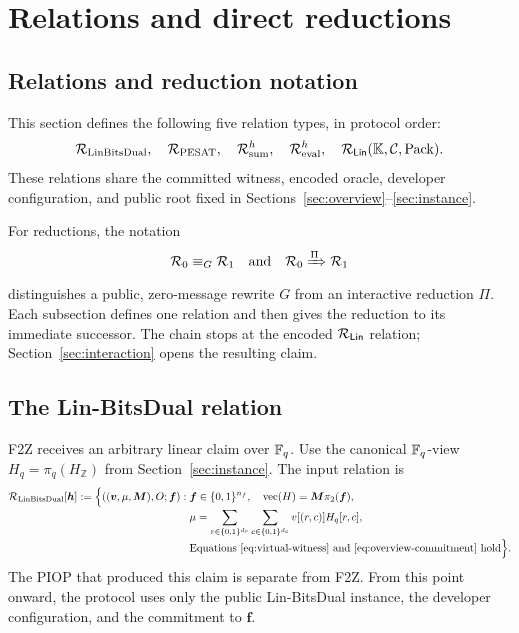 \section{Relations and direct reductions}
\label{sec:encoding}

\begingroup\footnotesize

\subsection{Relations and reduction notation}

This section defines the following five relation types, in protocol order:
\[
 \mathcal R_{\rm LinBitsDual},\quad
 \mathcal R_{\rm PESAT},\quad
 \mathcal R_{\rm sum}^{h},\quad
 \mathcal R_{\rm eval}^{h},\quad
 \mathcal R_{\mathsf{Lin}}(\mathbb K,\mathcal C,\operatorname{Pack}).
\]
These relations share the committed witness, encoded oracle, developer
configuration, and public root fixed in
Sections~\ref{sec:overview}--\ref{sec:instance}.

For reductions, the notation
\begin{equation}
 \mathcal R_0\equiv_G\mathcal R_1
 \quad\text{and}\quad
 \mathcal R_0\xRightarrow{\Pi}\mathcal R_1
 \label{eq:reduction-edge-notation}
\end{equation}
distinguishes a public, zero-message rewrite $G$ from an interactive
reduction $\Pi$.  Each subsection defines one relation and then gives the
reduction to its immediate successor.  The chain stops at the encoded $\mathcal R_{\mathsf{Lin}}$
relation; Section~\ref{sec:interaction} opens the resulting claim.

\subsection{The Lin-BitsDual relation}

F2Z receives an arbitrary linear claim over $\mathbb F_q$.  Use the canonical
$\mathbb F_q$-view $H_q=\pi_q(H_{\mathbb Z})$ from Section~\ref{sec:instance}.  The
input relation is
\begin{align}
 \mathcal R_{\rm LinBitsDual}[\bm h]:=
 \Bigl\{((\bm v,\mu,\bm M),O;\bm f):\;&
  \bm f\in\{0,1\}^{n_f},\quad
  \operatorname{vec}(H)=\bm M\pi_2(\bm f),\notag\\[-2pt]
 &\mu=\sum_{r\in\{0,1\}^{d_r}}\sum_{c\in\{0,1\}^{d_c}}
       v[(r,c)]H_q[r,c],\notag\\[-2pt]
 &\text{Equations~\eqref{eq:virtual-witness} and
   \eqref{eq:overview-commitment} hold}
 \Bigr\}.
 \label{eq:rel-linbits-h}
\end{align}
The PIOP that produced this claim is separate from F2Z.  From this
point onward, the protocol uses only the public Lin-BitsDual instance, the
developer configuration, and the commitment to $\bm f$.

